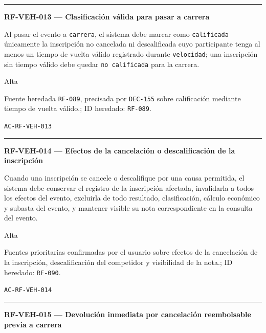 \documentclass[10pt,letterpaper]{article}
\begin{document}
\vspace{0.25em}\hrule\vspace{0.65em}
\noindent\textbf{RF-VEH-013 --- Clasificación válida para pasar a carrera}\par
\begin{description}[style=nextline,leftmargin=3.15cm,labelwidth=2.8cm,font=\normalfont\bfseries]
\item[Obligación] Al pasar el evento a \texttt{carrera}, el sistema debe marcar como \texttt{calificada} únicamente la inscripción no cancelada ni descalificada cuyo participante tenga al menos un tiempo de vuelta válido registrado durante \texttt{velocidad}; una inscripción sin tiempo válido debe quedar \texttt{no calificada} para la carrera.
\item[Prioridad] Alta
\item[Procedencia] Fuente heredada \texttt{RF-089}, precisada por \texttt{DEC-155} sobre calificación mediante tiempo de vuelta válido.; ID heredado: \texttt{RF-089}.
\item[Verificación] \texttt{AC-RF-VEH-013}
\end{description}
\vspace{0.25em}\hrule\vspace{0.65em}
\noindent\textbf{RF-VEH-014 --- Efectos de la cancelación o descalificación de la inscripción}\par
\begin{description}[style=nextline,leftmargin=3.15cm,labelwidth=2.8cm,font=\normalfont\bfseries]
\item[Obligación] Cuando una inscripción se cancele o descalifique por una causa permitida, el sistema debe conservar el registro de la inscripción afectada, invalidarla a todos los efectos del evento, excluirla de todo resultado, clasificación, cálculo económico y subasta del evento, y mantener visible su nota correspondiente en la consulta del evento.
\item[Prioridad] Alta
\item[Procedencia] Fuentes prioritarias confirmadas por el usuario sobre efectos de la cancelación de la inscripción, descalificación del competidor y visibilidad de la nota.; ID heredado: \texttt{RF-090}.
\item[Verificación] \texttt{AC-RF-VEH-014}
\end{description}
\vspace{0.25em}\hrule\vspace{0.65em}
\noindent\textbf{RF-VEH-015 --- Devolución inmediata por cancelación reembolsable previa a carrera}\par
\end{document}
